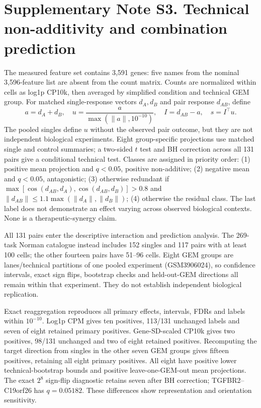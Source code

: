 \documentclass[a4paper,fleqn]{cas-sc}
\makeatletter
\DeclareRobustCommand{\rev}[1]{{\color{red}\def\@citecolor{black}\def\@linkcolor{red}\def\@urlcolor{red}#1}}
\makeatother
\begin{document}
\section*{Supplementary Note S3. Technical non-additivity and combination prediction}

The measured feature set contains 3,591 genes: five names from the nominal 3,596-feature list are absent from the count matrix. Counts are normalized within cells as log1p CP10k, then averaged by simplified condition and technical GEM group. \rev{For matched single-response vectors $d_A,d_B$ and pair response $d_{AB}$, define
{}
{\color{red}
\[
a=d_A+d_B,\quad u=\frac{a}{\max(\lVert a\rVert,10^{-10})},\quad I=d_{AB}-a,\quad s=I^\top u.
\]
}
\rev{}
The pooled singles define $u$ without the observed pair outcome, but they are not independent biological experiments. Eight group-specific projections use matched single and control summaries; a two-sided $t$ test and BH correction across all 131 pairs give a conditional technical test. Classes are assigned in priority order: (1) positive mean projection and $q<0.05$, positive non-additive; (2) negative mean and $q<0.05$, antagonistic; (3) otherwise redundant if $\max[\cos(d_{AB},d_A),\cos(d_{AB},d_B)]>0.8$ and $\lVert d_{AB}\rVert\leq1.1\max(\lVert d_A\rVert,\lVert d_B\rVert)$; (4) otherwise the residual class. The last label does not demonstrate an effect varying across observed biological contexts. None is a therapeutic-synergy claim.}

All 131 pairs enter the descriptive interaction and prediction analysis. The 269-task Norman catalogue instead includes 152 singles and 117 pairs with at least 100 cells; the other fourteen pairs have 51--96 cells. Eight GEM groups are lanes/technical partitions of one pooled experiment (GSM3906024), so confidence intervals, exact sign flips, bootstrap checks and held-out-GEM directions all remain within that experiment. They do not establish independent biological replication.

Exact reaggregation reproduces all primary effects, intervals, FDRs and labels within $10^{-10}$. Log1p CPM gives ten positives, 113/131 unchanged labels and seven of eight retained primary positives. Gene-SD-scaled CP10k gives two positives, 98/131 unchanged and two of eight retained positives. Recomputing the target direction from singles in the other seven GEM groups gives fifteen positives, retaining all eight primary positives. All eight have positive lower technical-bootstrap bounds and positive leave-one-GEM-out mean projections. \rev{The exact $2^8$ sign-flip diagnostic retains seven after BH correction; TGFBR2--C19orf26 has $q=0.05182$.} These differences show representation and orientation sensitivity.
\end{document}
